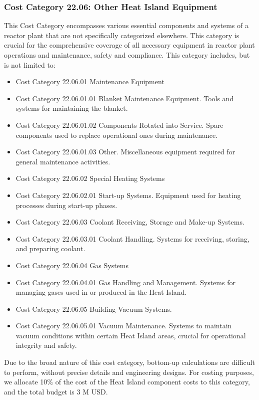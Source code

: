 \subsubsection{Cost Category 22.06: Other Heat Island Equipment}

This Cost Category encompasses various essential components and systems of a reactor plant that are not specifically categorized elsewhere. This category is crucial for the comprehensive coverage of all necessary equipment in reactor plant operations and maintenance, safety and compliance.  This category includes, but is not limited to:


\begin{itemize}
    \item Cost Category 22.06.01 Maintenance Equipment
    \item Cost Category 22.06.01.01 Blanket Maintenance Equipment. Tools and systems for maintaining the blanket.
    \item Cost Category 22.06.01.02 Components Rotated into Service. Spare components used to replace operational ones during maintenance.
    \item Cost Category 22.06.01.03 Other. Miscellaneous equipment required for general maintenance activities.
    \item Cost Category 22.06.02 Special Heating Systems
    \item Cost Category 22.06.02.01 Start-up Systems. Equipment used for heating processes during start-up phases.
    \item Cost Category 22.06.03 Coolant Receiving, Storage and Make-up Systems.
    \item Cost Category 22.06.03.01 Coolant Handling. Systems for receiving, storing, and preparing coolant.
    \item Cost Category 22.06.04 Gas Systems
    \item Cost Category 22.06.04.01 Gas Handling and Management. Systems for managing gases used in or produced in the Heat Island.
    \item Cost Category 22.06.05 Building Vacuum Systems.
    \item Cost Category 22.06.05.01 Vacuum Maintenance. Systems to maintain vacuum conditions within certain Heat Island areas, crucial for operational integrity and safety.
\end{itemize}

Due to the broad nature of this cost category, bottom-up calculations are difficult to perform, without precise details and engineering designs. For costing purposes, we allocate 10\% of the cost of the Heat Island component costs to this category, and the total budget is 3 M USD.